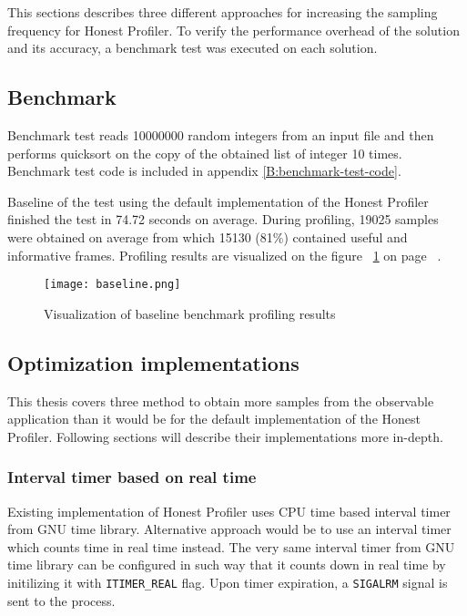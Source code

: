 \documentclass[..thesis.tex]{subfiles}
\begin{document}
This sections describes three different approaches for increasing the sampling frequency for Honest Profiler. To verify the performance overhead of the solution and its accuracy, a benchmark test was executed on each solution.

\subsection{Benchmark}
Benchmark test reads 10000000 random integers from an input file and then performs quicksort on the copy of the obtained list of integer 10 times. Benchmark test code is included in appendix \ref{B:benchmark-test-code}. 

Baseline of the test using the default implementation of the Honest Profiler finished the test in 74.72 seconds on average. During profiling, 19025 samples were obtained on average from which 15130 (81\%) contained useful and informative frames. Profiling results are visualized on the figure ~\ref{fig:baseline} on page ~\pageref{fig:baseline}.

\begin{figure}[H]
\texttt{[image: baseline.png]}
\caption{Visualization of baseline benchmark profiling results}
\label{fig:baseline}
\end{figure}

\subsection{Optimization implementations}
This thesis covers three method to obtain more samples from the observable application than it would be for the default implementation of the Honest Profiler. Following sections will describe their implementations more in-depth.

\subsubsection{Interval timer based on real time}
Existing implementation of Honest Profiler uses CPU time based interval timer from GNU time library. Alternative approach would be to use an interval timer which counts time in real time instead. The very same interval timer from GNU time library can be configured in such way that it counts down in real time by initilizing it with \texttt{ITIMER\_REAL} flag. Upon timer expiration, a \texttt{SIGALRM} signal is sent to the process.\cite{getitimer2}
\end{document}
